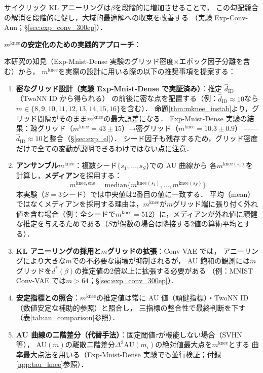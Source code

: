 \documentclass[11pt,a4paper]{jsarticle}
\newcommand{\mknee}{m^{\mathrm{knee}}}
\begin{document}
サイクリック KL アニーリング\cite{fu2019cyclical}は$\beta$を段階的に増加させることで，
この勾配競合の解消を段階的に促し，大域的最適解への収束を改善する
（実験 Exp-Conv-Ann；§\ref{sec:exp_conv_300ep}）．

\textbf{$\mknee$の安定化のための実践的アプローチ}：

本研究の知見（Exp-Mnist-Dense 実験のグリッド密度×エポック因子分離を含む）から，
$\mknee$を実際の設計に用いる際の以下の推奨事項を提案する：
\begin{enumerate}
  \item \textbf{密なグリッド設計（実験 Exp-Mnist-Dense で実証済み）}：推定 $\hat{d}_\mathrm{ID}$（TwoNN ID から得られる）
        の前後に密な点を配置する（例：$\hat{d}_\mathrm{ID} \approx 10$なら$m \in \{8,9,10,11,12,13,14,15,16\}$を含む）．
        命題\ref{thm:mknee_instab}より，グリッド間隔がそのまま$\mknee$の最大誤差になる．
        Exp-Mnist-Dense 実験の結果：疎グリッド（$\mknee=43\pm15$）→密グリッド（$\mknee=10.3\pm0.9$）
        —— $\hat{d}_\mathrm{ID} \approx 10$と整合（§\ref{sec:exp_el}）．
        シード因子も残存するため，グリッド密度だけで全ての変動が説明できるわけではない点に注意．
  \item \textbf{アンサンブル$\mknee$}：複数シード$\{s_1,\ldots,s_S\}$での AU 曲線から
        各$m^{\mathrm{knee}(s_i)}$を計算し，\textbf{メディアン}を採用する：
        \begin{equation}
          m^{\mathrm{knee,ens}} = \mathrm{median}\bigl\{m^{\mathrm{knee}(s_1)}, \ldots, m^{\mathrm{knee}(s_S)}\bigr\}
          \label{eq:mknee_ens}
        \end{equation}
        本実験（$S=3$シード）では中央値は2番目の値に一致する．
        平均（mean）ではなくメディアンを採用する理由は，$\mknee$が$m$グリッド端に張り付く外れ値を含む場合（例：全シードで$\mknee=512$）に，メディアンが外れ値に頑健な推定を与えるためである（$S$が偶数の場合は隣接する2値の算術平均とする）．
  \item \textbf{KL アニーリングの採用と$m$グリッドの拡張}：Conv-VAE では，
        アニーリングにより大きな$m$での不必要な崩壊が抑制されるが，
        AU 飽和の観測には$m$グリッドを$d^*(\beta)$の推定値の2倍以上に拡張する必要がある
        （例：MNIST Conv-VAE では$m > 64$；§\ref{sec:exp_conv_300ep}）．
  \item \textbf{安定指標との照合}：$\mknee$の推定値は常に AU 値（頑健指標）・TwoNN ID（数値安定な補助的参照）と照合し，
        三指標の整合性で最終判断を下す（表\ref{tab:au_comparison}参照）．
  \item \textbf{AU 曲線の二階差分（代替手法）}：固定閾値$\tau$が機能しない場合（SVHN 等），
        AU$(m)$の離散二階差分$\Delta^2\mathrm{AU}(m_i)$の絶対値最大点を$\mknee$とする
        曲率最大点法を用いる（Exp-Mnist-Dense 実験でも並行検証；付録\ref{app:tau_knee}参照）．
\end{enumerate}
\end{document}
